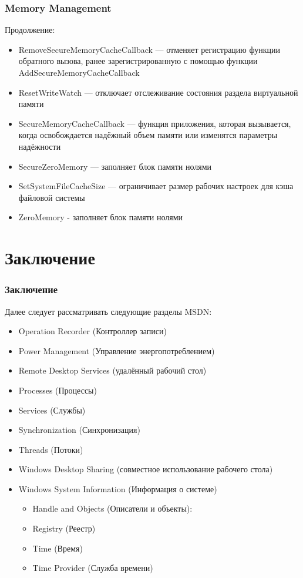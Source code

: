 \documentclass{beamer}
\begin{document}
\begin{frame}
\frametitle{Memory Management }

Продолжение:
\begin{itemize}
\item RemoveSecureMemoryCacheCallback — отменяет регистрацию функции обратного вызова, ранее зарегистрированную с помощью функции AddSecureMemoryCacheCallback
\item ResetWriteWatch — отключает отслеживание состояния раздела виртуальной памяти
\item SecureMemoryCacheCallback — функция приложения, которая вызывается, когда освобождается надёжный объем памяти или изменятся параметры надёжности
\item SecureZeroMemory — заполняет блок памяти нолями
\item SetSystemFileCacheSize — ограничивает размер рабочих настроек для кэша файловой системы
\item ZeroMemory - заполняет блок памяти нолями
\end{itemize}

\end{frame}

\section{Заключение}

\begin{frame}
\frametitle{Заключение}

Далее следует рассматривать следующие разделы MSDN:

\begin{itemize}
\item Operation Recorder (Контроллер записи)
\item Power Management (Управление энергопотреблением)
\item Remote Desktop Services (удалённый рабочий стол)
\item Processes (Процессы)
\item Services (Службы)
\item Synchronization (Синхронизация)
\item Threads (Потоки)
\item Windows Desktop Sharing (совместное использование рабочего стола)
\item Windows System Information (Информация о системе)
\begin{itemize}
    \item Handle and Objects (Описатели и объекты):
    \item Registry (Реестр)
    \item Time (Время)
    \item Time Provider (Служба времени)
\end{itemize}
\end{itemize}
\end{frame}
\end{document}
